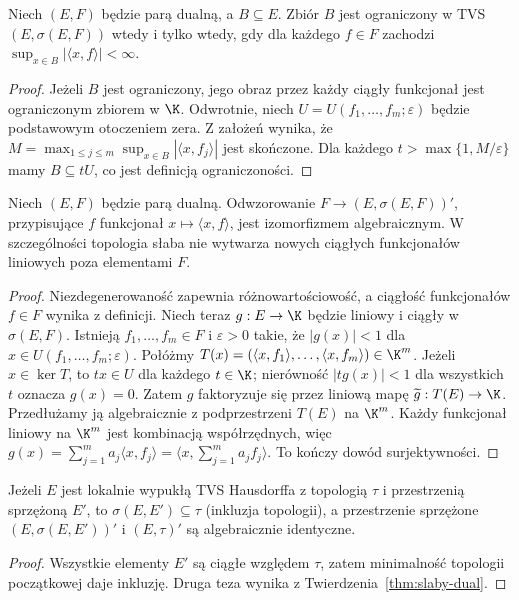 \begin{stwierdzenie}\label{prop:slaba-ograniczonosc}
Niech $(E,F)$ będzie parą dualną, a $B\subseteq E$.
Zbiór $B$ jest ograniczony w TVS $(E,\sigma(E,F))$
wtedy i tylko wtedy, gdy dla każdego $f\in F$
zachodzi $\sup_{x\in B}|\langle x,f\rangle|<\infty$.
\end{stwierdzenie}
\begin{proof}
Jeżeli $B$ jest ograniczony, jego obraz przez każdy ciągły
funkcjonał jest ograniczonym zbiorem w $\K$.
Odwrotnie, niech $U=U(f_1,\ldots,f_m;\varepsilon)$
będzie podstawowym otoczeniem zera. Z założeń wynika, że
$M=\max_{1\le j\le m}\sup_{x\in B}|\langle x,f_j\rangle|$
jest skończone. Dla każdego $t>\max\{1,M/\varepsilon\}$
mamy $B\subseteq tU$, co jest definicją ograniczoności.
\end{proof}

\begin{twierdzenie}\label{thm:slaby-dual}
Niech $(E,F)$ będzie parą dualną. Odwzorowanie
$F\to(E,\sigma(E,F))'$, przypisujące $f$ funkcjonał
$x\mapsto\langle x,f\rangle$, jest izomorfizmem
algebraicznym. W szczególności topologia słaba nie wytwarza
nowych ciągłych funkcjonałów liniowych poza elementami $F$.
\end{twierdzenie}
\begin{proof}
Niezdegenerowaność zapewnia różnowartościowość, a
ciągłość funkcjonałów $f\in F$ wynika z definicji.
Niech teraz $g:E\to\K$ będzie liniowy i ciągły w
$\sigma(E,F)$. Istnieją $f_1,\ldots,f_m\in F$
i $\varepsilon>0$ takie, że
$|g(x)|<1$ dla $x\in U(f_1,\ldots,f_m;\varepsilon)$.
Połóżmy $T(x)=(\langle x,f_1\rangle,\ldots,
\langle x,f_m\rangle)\in\K^m$. Jeżeli $x\in\ker T$,
to $tx\in U$ dla każdego $t\in\K$; nierówność
$|t g(x)|<1$ dla wszystkich $t$ oznacza $g(x)=0$.
Zatem $g$ faktoryzuje się przez liniową mapę
$\widetilde g:T(E)\to\K$. Przedłużamy ją algebraicznie
z podprzestrzeni $T(E)$ na $\K^m$. Każdy funkcjonał
liniowy na $\K^m$ jest kombinacją współrzędnych,
więc $g(x)=\sum_{j=1}^m a_j\langle x,f_j\rangle
=\langle x,\sum_{j=1}^m a_j f_j\rangle$.
To kończy dowód surjektywności.
\end{proof}

\begin{wniosek}\label{cor:slaba-wyjsciowa}
Jeżeli $E$ jest lokalnie wypukłą TVS Hausdorffa z topologią
$\tau$ i przestrzenią sprzężoną $E'$, to
$\sigma(E,E')\subseteq\tau$ (inkluzja topologii),
a przestrzenie sprzężone $(E,\sigma(E,E'))'$ i
$(E,\tau)'$ są algebraicznie identyczne.
\end{wniosek}
\begin{proof}
Wszystkie elementy $E'$ są ciągłe względem $\tau$,
zatem minimalność topologii początkowej daje inkluzję.
Druga teza wynika z Twierdzenia~\ref{thm:slaby-dual}.
\end{proof}

